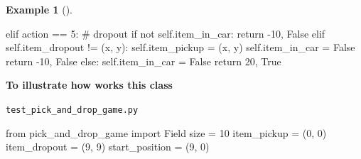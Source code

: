 \documentclass[
  letterpaper,
]{krantz}
\makeatletter
\newenvironment{Shaded}{\begin{snugshade}}{\end{snugshade}}
\newcommand{\CommentTok}[1]{\textcolor[rgb]{0.37,0.37,0.37}{#1}}
\newcommand{\ControlFlowTok}[1]{\textcolor[rgb]{0.00,0.23,0.31}{#1}}
\newcommand{\DecValTok}[1]{\textcolor[rgb]{0.68,0.00,0.00}{#1}}
\newcommand{\ImportTok}[1]{\textcolor[rgb]{0.00,0.46,0.62}{#1}}
\newcommand{\KeywordTok}[1]{\textcolor[rgb]{0.00,0.23,0.31}{#1}}
\newcommand{\NormalTok}[1]{\textcolor[rgb]{0.00,0.23,0.31}{#1}}
\newcommand{\OperatorTok}[1]{\textcolor[rgb]{0.37,0.37,0.37}{#1}}
\newcommand{\VariableTok}[1]{\textcolor[rgb]{0.07,0.07,0.07}{#1}}
\newenvironment{kframe}{%
\medskip{}
\setlength{\fboxsep}{.8em}
 \def\at@end@of@kframe{}%
 \ifinner\ifhmode%
  \def\at@end@of@kframe{\end{minipage}}%
  \begin{minipage}{\columnwidth}%
 \fi\fi%
 \def\FrameCommand##1{\hskip\@totalleftmargin \hskip-\fboxsep
 \colorbox{shadecolor}{##1}\hskip-\fboxsep
     \hskip-\linewidth \hskip-\@totalleftmargin \hskip\columnwidth}%
 \MakeFramed {\advance\hsize-\width
   \@totalleftmargin\z@ \linewidth\hsize
   \@setminipage}}%
 {\par\unskip\endMakeFramed%
 \at@end@of@kframe}
\renewenvironment{Shaded}{\begin{kframe}}{\end{kframe}}
\theoremstyle{plain}
\theoremstyle{definition}
\newtheorem{example}{Example}[chapter]
\theoremstyle{definition}
\theoremstyle{remark}
\makeatother
\begin{document}
\begin{example}[]
\begin{tcolorbox}[enhanced jigsaw, bottomrule=.15mm, opacityback=0, breakable, colframe=quarto-callout-tip-color-frame, left=2mm, rightrule=.15mm, toprule=.15mm, leftrule=.75mm, arc=.35mm, colback=white]
\begin{codelisting}[H]
\begin{Shaded}
\begin{Highlighting}[]
        \ControlFlowTok{elif}\NormalTok{ action }\OperatorTok{==} \DecValTok{5}\NormalTok{:  }\CommentTok{\# dropout}
            \ControlFlowTok{if} \KeywordTok{not} \VariableTok{self}\NormalTok{.item\_in\_car:}
                \ControlFlowTok{return} \OperatorTok{{-}}\DecValTok{10}\NormalTok{, }\VariableTok{False}
            \ControlFlowTok{elif} \VariableTok{self}\NormalTok{.item\_dropout }\OperatorTok{!=}\NormalTok{ (x, y):}
                \VariableTok{self}\NormalTok{.item\_pickup }\OperatorTok{=}\NormalTok{ (x, y)}
                \VariableTok{self}\NormalTok{.item\_in\_car }\OperatorTok{=} \VariableTok{False}
                \ControlFlowTok{return} \OperatorTok{{-}}\DecValTok{10}\NormalTok{, }\VariableTok{False}
            \ControlFlowTok{else}\NormalTok{:}
                \VariableTok{self}\NormalTok{.item\_in\_car }\OperatorTok{=} \VariableTok{False}
                \ControlFlowTok{return} \DecValTok{20}\NormalTok{, }\VariableTok{True}
\end{Highlighting}
\end{Shaded}

\end{codelisting}

\end{tcolorbox}

\begin{tcolorbox}[enhanced jigsaw, bottomrule=.15mm, opacityback=0, breakable, colframe=quarto-callout-tip-color-frame, left=2mm, rightrule=.15mm, toprule=.15mm, leftrule=.75mm, arc=.35mm, colback=white]

\vspace{-3mm}\textbf{To illustrate how works this class}\vspace{3mm}

\begin{codelisting}[H]

\caption{\texttt{test\_pick\_and\_drop\_game.py}}

\begin{Shaded}
\begin{Highlighting}[]
\ImportTok{from}\NormalTok{ pick\_and\_drop\_game }\ImportTok{import}\NormalTok{ Field}
\NormalTok{size }\OperatorTok{=} \DecValTok{10}
\NormalTok{item\_pickup }\OperatorTok{=}\NormalTok{ (}\DecValTok{0}\NormalTok{, }\DecValTok{0}\NormalTok{)}
\NormalTok{item\_dropout }\OperatorTok{=}\NormalTok{ (}\DecValTok{9}\NormalTok{, }\DecValTok{9}\NormalTok{)}
\NormalTok{start\_position }\OperatorTok{=}\NormalTok{ (}\DecValTok{9}\NormalTok{, }\DecValTok{0}\NormalTok{)}




\end{Highlighting}
\end{Shaded}
\end{codelisting}
\end{tcolorbox}
\end{example}
\end{document}
